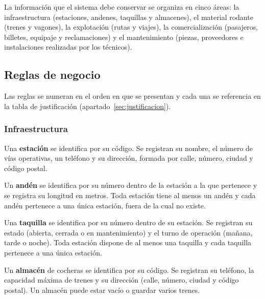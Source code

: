 \documentclass[11pt,a4paper]{article}
\DeclareRobustCommand{\_}{\textunderscore\allowbreak}
\newcommand{\RN}[1]{\textbf{RN-#1}}
\begin{document}
La información que el sistema debe conservar se organiza en cinco áreas: la infraestructura (estaciones, andenes, taquillas y almacenes), el material rodante (trenes y vagones), la explotación (rutas y viajes), la comercialización (pasajeros, billetes, equipaje y reclamaciones) y el mantenimiento (piezas, proveedores e instalaciones realizadas por los técnicos).

\subsection{Reglas de negocio}
Las reglas se numeran en el orden en que se presentan y cada una se referencia en la tabla de justificación (apartado~\ref{sec:justificacion}).

\subsubsection*{Infraestructura}
\begin{description}[leftmargin=1.4cm,style=nextline]
\item[\RN{01}] Una \textbf{estación} se identifica por su código. Se registran su nombre, el número de vías operativas, un teléfono y su dirección, formada por calle, número, ciudad y código postal.
\item[\RN{02}] Un \textbf{andén} se identifica por su número dentro de la estación a la que pertenece y se registra su longitud en metros. Toda estación tiene al menos un andén y cada andén pertenece a una única estación, fuera de la cual no existe.
\item[\RN{03}] Una \textbf{taquilla} se identifica por su número dentro de su estación. Se registran su estado (abierta, cerrada o en mantenimiento) y el turno de operación (mañana, tarde o noche). Toda estación dispone de al menos una taquilla y cada taquilla pertenece a una única estación.
\item[\RN{04}] Un \textbf{almacén} de cocheras se identifica por su código. Se registran su teléfono, la capacidad máxima de trenes y su dirección (calle, número, ciudad y código postal). Un almacén puede estar vacío o guardar varios trenes.
\end{description}
\end{document}
